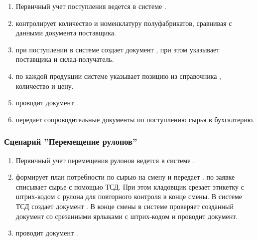 \begin{enumerate}
\item Первичный учет поступления ведется в системе \erp.
\item \kladovshik контролирует количество и номенклатуру полуфабрикатов, сравнивая с данными документа поставщика.
\item \kladovshik  при поступлении в системе \erp создает документ , при этом указывает поставщика и склад-получатель. 
\item \kladovshik  по каждой продукции системе \erp указывает позицию из справочника , количество и цену.
\item \kladovshik  проводит документ .
\item \kladovshik передает сопроводительные документы по поступлению сырья в бухгалтерию.



\end{enumerate}



\subsubsection{Сценарий ''Перемещение рулонов''}
\label{bp:storage_6}

\begin{enumerate}
\item  	Первичный учет перемещения рулонов ведется в системе \erp.
\item 	\planner формирует план потребности по сырью на смену и передает \gaoperator.
\kladovshik по заявке списывает сырье с помощью ТСД. При этом кладовщик срезает этикетку с штрих-кодом с рулона для повторного контроля в конце смены.
В системе \erp ТСД создает документ . В конце смены \kladovshik в системе \erp проверяет созданный документ со срезанными ярлыками с штрих-кодом и проводит документ.
\item 	\kladovshik проводит документ .
\end{enumerate}



